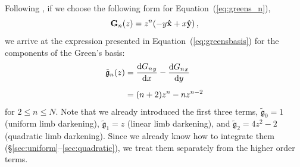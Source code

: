 \documentclass[modern,trackchanges]{aastex63}
\begin{document}
%
Following \citet{starry},
if we choose the following form for
Equation~(\ref{eq:greens_n}),
%
\begin{equation}
\mathbf{G}_n(z) = z^n (-y \xhat + x \yhat) \quad,
\end{equation}
%
we arrive at the expression presented in Equation~(\ref{eq:greensbasis})
for the components of the Green's basis:
%
\begin{align}
\tilde{\mathfrak{g}}_n(z)   &= \frac{ \mathrm{d} {G_n}_y}{ \mathrm{d} \mbox{$x$}} - \frac{ \mathrm{d} {G_n}_x}{ \mathrm{d} \mbox{$y$}} \nonumber \\[0.5em]
              &= (n+2)z^n-n z^{n-2}
\end{align}
%
for $2 \le n \le N$.
%
Note that we already introduced the first three terms, $\tilde{\mathfrak{g}}_0 = 1$
(uniform limb darkening), $\tilde{\mathfrak{g}}_1 = z$ (linear limb darkening),
and $\tilde{\mathfrak{g}}_2 = 4z^2 - 2$ (quadratic limb darkening).
Since we already know how to integrate them (\S\ref{sec:uniform}--\ref{sec:quadratic}),
we treat them separately from the higher order terms.

\end{document}
